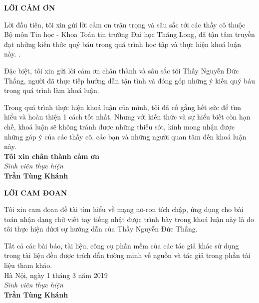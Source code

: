 \vspace*{5cm}
\begin{center}
\textbf{LỜI CẢM ƠN}
\end{center}
\hspace{6mm}Lời đầu tiên, tôi xin gửi lời cảm ơn trận trọng và sâu sắc tới các thầy cô thuộc Bộ môn Tin học - Khoa Toán tin trường Đại học Thăng Long, đã tận tâm truyền đạt những kiến thức quý báu trong quá trình học tập và thực hiện khoá luận này. .\par
Đặc biệt, tôi xin gửi lời cảm ơn chân thành và sâu sắc tới Thầy Nguyễn Đức Thắng, người đã thực tiếp hướng dẫn tận tình và đóng góp những ý kiến quý báu trong quá trình làm khoá luận. \par
Trong quá trình thực hiện khoá luận của mình, tôi đã cố gắng hết sức để tìm hiểu và hoàn thiện 1 cách tốt nhất. Nhưng với kiến thức và sự hiểu biết còn hạn chế, khoá luận sẽ không tránh được những thiếu sót, kính mong nhận được những góp ý của các thầy cô, các bạn và những người quan tâm đến khoá luận này. \\
[0.5cm]
\hspace*{5mm} \textbf{Tôi xin chân thành cảm ơn}\\
[0.5cm]
\hspace*{11cm} \textit{Sinh viên thực hiện}\\
[1.5cm]
\hspace*{11.3cm} \textbf{Trần Tùng Khánh}


\newpage
\vspace*{5cm}
\begin{center}
\textbf{LỜI CAM ĐOAN}
\end{center}
\hspace{5mm} Tôi xin cam đoan đề tài tìm hiểu về mạng nơ-ron tích chập, ứng dụng cho bài toán nhận dạng chữ viết tay tiếng nhật được trình bày trong khoá luận này là do tôi thực hiện dứơi sự hướng dẫn của Thầy Nguyễn Đức Thắng. \par
Tất cả các bài báo, tài liệu, công cụ phần mềm của các tác giả khác sử dụng trong tài liệu đều được trích dẫn tường minh về nguồn và tác giả trong phần tài liệu tham khảo. \\
[1cm]
\hspace*{9cm} Hà Nội, ngày 1 tháng 3 năm 2019\\
\hspace*{10.5cm} \textit{Sinh viên thực hiện}\\
[2cm]
\hspace*{10cm} \textbf{Trần Tùng Khánh}\\
\thispagestyle{empty}

